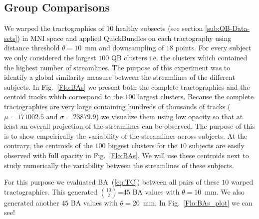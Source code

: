 \documentclass{bioinfo}
\begin{document}


\subsection{Group Comparisons \label{sub:group_comp}}

We warped the tractographies of $10$ healthy subsects (see section \ref{sub:QB-Data-sets}) in MNI space and applied QuickBundles on each tractography using distance threshold $\theta=10$~mm and downsampling of $18$ points. For every subject we only considered the largest $100$ QB clusters i.e. the clusters which contained the highest number of streamlines. The purpose of this experiment was to identify a global similarity measure between the streamlines of the different subjects. In Fig.~\ref{Flo:BAs} we present both the complete tractographies and the centoid tracks which correspond to the $100$ largest clusters. Because the complete tractographies are very large containing hundreds of thousands of tracks ($\mu=\num{171002.5}$ and $\sigma=\num{23879.9}$) we visualize them using low opacity so that at least an overall projection of the streamlines can be observed. The purpose of this is to show empeirically the variability of the streamlines across subjects. At the contrary, the centroids of the $100$ biggest clusters for the $10$ subjects are easily observed with full opacity in Fig.~\ref{Flo:BAs}. We will use these centroids next to study numerically the variability between the streamlines of these subjects. 

For this purpose we evaluated BA~(\ref{eq:TC}) between all pairs of these $10$ warped tractographies. This generated ${10}\choose{2}$=$45$ BA values with $\theta=10$~mm. We also generated another $45$ BA values with $\theta=20$~mm.  
In Fig.~\ref{Flo:BAs_plot} we can see!
\end{document}
